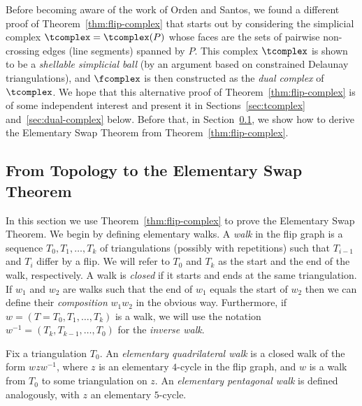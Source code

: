 Before becoming aware of the work of Orden and Santos, we found a different proof
of Theorem~\ref{thm:flip-complex} that starts out by considering  the simplicial complex 
$\tcomplex=\tcomplex(P)$ whose faces are the sets of pairwise non-crossing edges (line segments) spanned by $P$. This complex $\tcomplex$ is shown to be a \emph{shellable simplicial ball} (by an argument based on constrained Delaunay triangulations), and $\fcomplex$ is then constructed as the \emph{dual complex} of $\tcomplex$. We hope that this alternative proof of Theorem~\ref{thm:flip-complex} is of some independent interest and present it in Sections~\ref{sec:tcomplex} and~\ref{sec:dual-complex} below.  Before that, in Section~\ref{sec:top-to-swap}, we show how to derive the Elementary Swap Theorem from Theorem~\ref{thm:flip-complex}. 



\subsection{From Topology to the Elementary Swap Theorem}
\label{sec:top-to-swap}


In this section we use Theorem~\ref{thm:flip-complex} to prove the Elementary Swap Theorem.
We begin by defining elementary walks.
A \emph{walk} in the flip graph is a sequence $T_0,T_1,\dots,T_k$ of triangulations (possibly with repetitions) such that $T_{i-1}$ and $T_i$ differ by a flip. We will refer to $T_0$ and $T_k$ as the start and the end of the walk, respectively.
A walk is \emph{closed} if it starts and ends at the same triangulation.  
If $w_1$ and $w_2$ are walks such that the end of $w_1$ equals the start of $w_2$ then 
we can define their \emph{composition} $w_1w_2$ in the obvious way. 
Furthermore, if  $w=(T=T_0,T_1,\ldots,T_k)$ is a walk, we will use the notation 
$w^{-1}=(T_k,T_{k-1},\dots,T_0)$ for the \emph{inverse walk}.

Fix a triangulation $T_0$. An \emph{elementary quadrilateral walk} is a closed walk of the form 
$wzw^{-1}$, where $z$ is an elementary $4$-cycle in the flip graph, and $w$ is a walk 
from $T_0$ to some triangulation on $z$. An \emph{elementary pentagonal walk} is defined analogously, with $z$ an elementary $5$-cycle.


